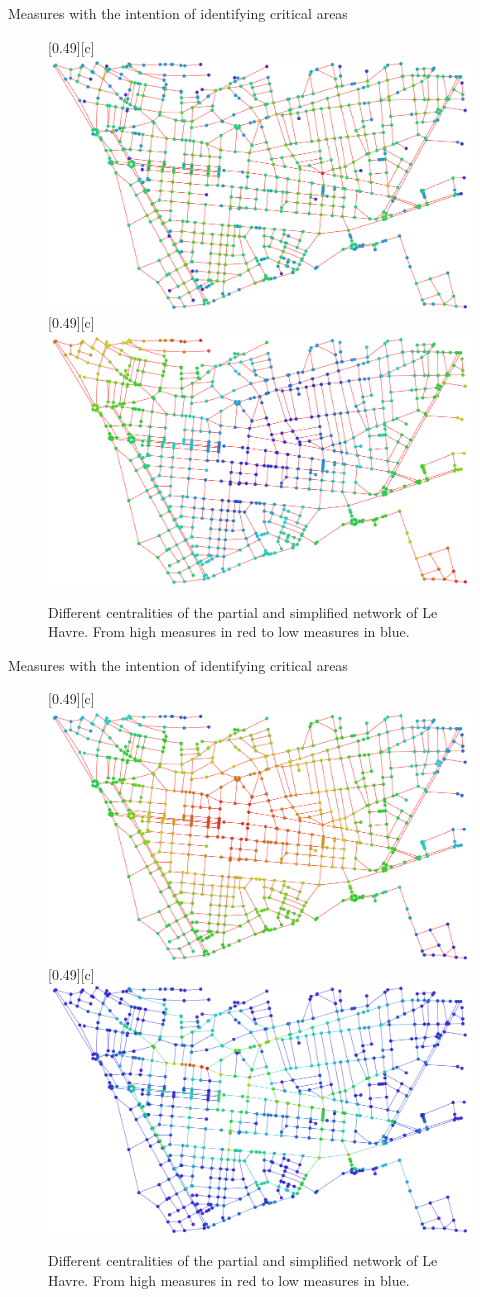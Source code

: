 \documentclass{beamer}
\begin{document}
\begin{frame}{Measures with the intention of identifying critical areas}
	\begin{figure}[htbp]
		\centering
		[0.49\linewidth][c]{
			\includegraphics[width=0.49\linewidth]{./img/degree_centrality.pdf}
		}
		\hfill
		[0.49\linewidth][c]{
			\includegraphics[width=0.49\linewidth]{./img/max_farness_centrality.pdf}
		}
		\caption{Different centralities of the partial and simplified network of Le Havre. From high measures in red to low measures in blue.}
		\label{fig:centralities_1}
	\end{figure}
\end{frame}

\begin{frame}{Measures with the intention of identifying critical areas}
	\begin{figure}[htbp]
		\centering
		[0.49\linewidth][c]{
			\includegraphics[width=0.49\linewidth]{./img/closeness_centrality.pdf}
		}
		\hfill
		[0.49\linewidth][c]{
			\includegraphics[width=0.49\linewidth]{./img/betwenness_centrality.pdf}
		}
		\caption{Different centralities of the partial and simplified network of Le Havre. From high measures in red to low measures in blue.}
		\label{fig:centralities_2}
	\end{figure}
\end{frame}
\end{document}
